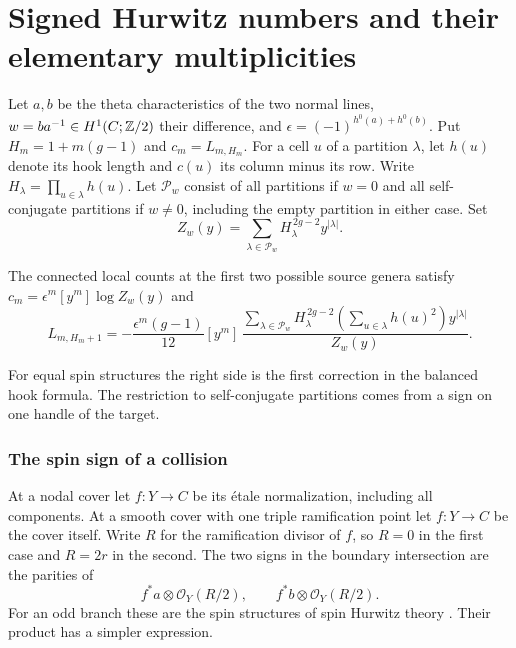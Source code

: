 \section{Signed Hurwitz numbers and their elementary multiplicities}\label{p8-sec:characters}

Let $a,b$ be the theta characteristics of the two normal lines,
$w=ba^{-1}\in H^1(C;\mathbb Z/2)$ their difference, and
$\epsilon=(-1)^{h^0(a)+h^0(b)}$. Put $H_m=1+m(g-1)$ and
$c_m=L_{m,H_m}$. For a cell $u$ of a partition $\lambda$, let
$h(u)$ denote its hook length and $c(u)$ its column minus its row.
Write $H_\lambda=\prod_{u\in\lambda}h(u)$. Let $\mathcal P_w$
consist of all partitions if $w=0$ and all self-conjugate partitions
if $w\ne0$, including the empty partition in either case. Set
\[
 Z_w(y)=\sum_{\lambda\in\mathcal P_w}
               H_\lambda^{\,2g-2}y^{|\lambda|}.
\]

\begin{theorem}\label{p8-thm:hooks}
The connected local counts at the first two possible source genera
satisfy $c_m=\epsilon^m[y^m]\log Z_w(y)$ and
\begin{equation}
 L_{m,H_m+1}
 =-\frac{\epsilon^m(g-1)}{12}[y^m]\,
  \frac{\displaystyle\sum_{\lambda\in\mathcal P_w}
         H_\lambda^{\,2g-2}\!
         \left(\sum_{u\in\lambda}h(u)^2\right)y^{|\lambda|}}
       {Z_w(y)}.
 \label{p8-eq:character-first-excess}
\end{equation}
\end{theorem}

For equal spin structures the right side is the first correction
in the balanced hook formula. The restriction to self-conjugate
partitions comes from a sign on one handle of the target.

\subsubsection{The spin sign of a collision}
At a nodal cover let $f:Y\to C$ be its \'etale normalization,
including all components. At a smooth cover with one triple
ramification point let $f:Y\to C$ be the cover itself. Write
$R$ for the ramification divisor of $f$, so $R=0$ in the first
case and $R=2r$ in the second. The two signs in the boundary
intersection are the parities of
\[
       f^*a\otimes\mathcal O_Y(R/2),\qquad
       f^*b\otimes\mathcal O_Y(R/2).
\]
For an odd branch these are the spin structures of spin Hurwitz
theory \cite{eop}. Their product has a simpler expression.

